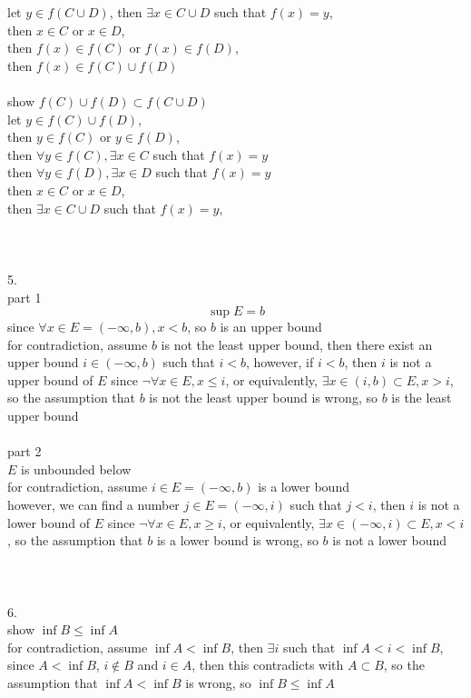 \documentclass[12pt, border = 4pt, multi]{article} %
\begin{document}
let $y \in f(C \cup D)$, then $\exists x \in C \cup D$ such that $f(x) = y$,\\
then $x \in C$ or $x \in D$,\\
then $f(x) \in f(C)$ or $f(x) \in f(D)$,\\
then $f(x) \in f(C) \cup f(D)$\\
\\
show $f(C) \cup f(D) \subset f(C \cup D)$\\
let $y \in f(C) \cup f(D)$,\\
then $y \in f(C)$ or $y \in f(D)$,\\
then $\forall y \in f(C), \exists x \in C$ such that $f(x) = y$\\
then $\forall y \in f(D), \exists x \in D$ such that $f(x) = y$\\
then $x \in C$ or $x \in D$,\\
then $\exists x \in C \cup D$ such that $f(x) = y$,\\
\\
\\
\\
5.\\
part 1
\[\sup E = b\]
since $\forall x \in E = (-\infty, b), x < b$, so $b$ is an upper bound\\
for contradiction, assume $b$ is not the least upper bound, then there exist an upper bound $i \in (-\infty, b)$ such that $i < b$, however, if $i < b$, then $i$ is not a upper bound of $E$ since $\neg\forall x \in E, x \leq i$, or equivalently, $\exists x \in (i, b) \subset E, x > i$, so the assumption that $b$ is not the least upper bound is wrong, so $b$ is the least upper bound\\
\\
part 2\\
$E$ is unbounded below\\
for contradiction, assume $i \in E = (-\infty, b)$ is a lower bound\\
however, we can find a number $j \in E = (-\infty, i)$ such that $j < i$, then $i$ is not a lower bound of $E$ since $\neg\forall x \in E, x \geq i$, or equivalently, $\exists x \in (-\infty, i) \subset E, x < i$, so the assumption that $b$ is a lower bound is wrong, so $b$ is not a lower bound\\
\\
\\
\\
6.\\
show $\inf B \leq \inf A$\\
for contradiction, assume $\inf A < \inf B$, then $\exists i$ such that $\inf A < i < \inf B$, since $A < \inf B$, $i \not\in B$ and $i \in A$, then this contradicts with $A \subset B$, so the assumption that $\inf A < \inf B$ is wrong, so $\inf B \leq \inf A$\\
\end{document}
